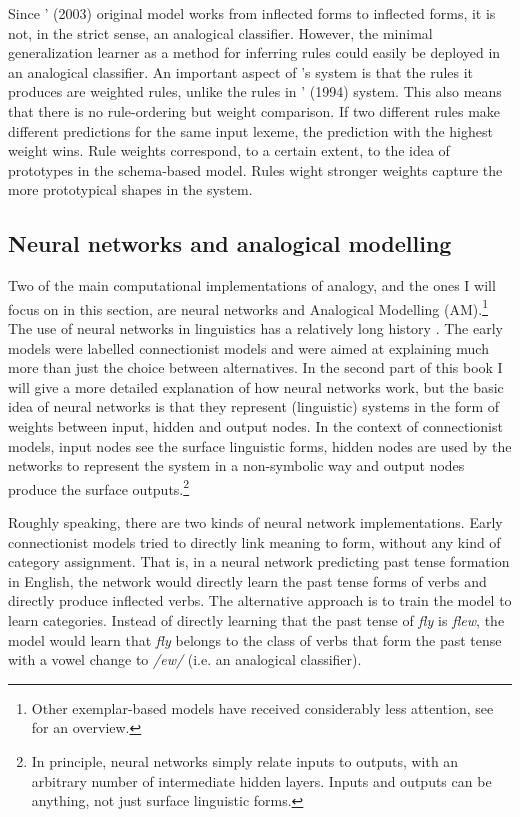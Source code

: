 Since \citeauthor{Albright.2003}' (2003) original model works from inflected forms to inflected forms, it is not, in the strict sense, an analogical classifier. However, the minimal generalization learner as a method for inferring rules could easily be deployed in an analogical classifier. An important aspect of \citet{Albright.2003}'s system is that the rules it produces are weighted rules, unlike the rules in \citeauthor{Viks.1994}' (1994) system. This also means that there is no rule-ordering but weight comparison. If two different rules make different predictions for the same input lexeme, the prediction with the highest weight wins. Rule weights correspond, to a certain extent, to the idea of prototypes in the schema-based model. Rules wight stronger weights capture the more prototypical shapes in the system.


\subsection{Neural networks and analogical modelling}


Two of the main computational implementations of analogy, and the ones I will focus on in this section, are neural networks and Analogical Modelling (AM).\footnote{Other exemplar-based models have received considerably less attention, see \citet{Matthews.2005} for an overview.} The use of neural networks in linguistics has a relatively long history \autocites{Bechtel.2002, Churchland.1989, McClelland.1986, Rumelhart.1986, Rumelhart.1986a}. The early models were labelled connectionist models and were aimed at explaining much more than just the choice between alternatives. In the second part of this book I will give a more detailed explanation of how neural networks work, but the basic idea of neural networks is that they represent (linguistic) systems in the form of weights between input, hidden and output nodes. In the context of connectionist models, input nodes see the surface linguistic forms, hidden nodes are used by the networks to represent the system in a non-symbolic way and output nodes produce the surface outputs.\footnote{In principle, neural networks simply relate inputs to outputs, with an arbitrary number of intermediate hidden layers. Inputs and outputs can be anything, not just surface linguistic forms.}

Roughly speaking, there are two kinds of neural network implementations. Early connectionist models tried to directly link meaning to form, without any kind of category assignment. That is, in a neural network predicting past tense formation in English, the network would directly learn the past tense forms of verbs and directly produce inflected verbs.
The alternative approach is to train the model to learn categories. Instead of directly learning that the past tense of \textit{fly} is \textit{flew}, the model would learn that \textit{fly} belongs to the class of verbs that form the past tense with a vowel change to \textit{/ew/} (i.e. an analogical classifier).

